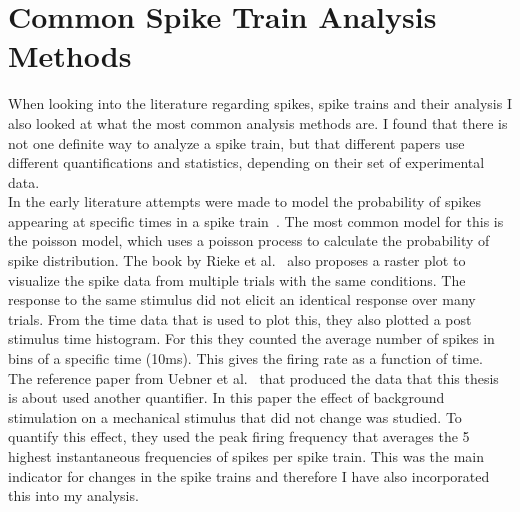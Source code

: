 \section{Common Spike Train Analysis Methods}
When looking into the literature regarding spikes, spike trains and their analysis I also looked at what the most common analysis methods are. I found that there is not one definite way to analyze a spike train, but that different papers use different quantifications and statistics, depending on their set of experimental data.\\
In the early literature attempts were made to model the probability of spikes appearing at specific times in a spike train~\cite{spikeGeneral}. The most common model for this is the poisson model, which uses a poisson process to calculate the probability of spike distribution.
The book by Rieke et al.~\cite{rieke1999spikes} also proposes a raster plot to visualize the spike data from multiple trials with the same conditions. The response to the same stimulus did not elicit an identical response over many trials. From the time data that is used to plot this, they also plotted a post stimulus time histogram. For this they counted the average number of spikes in bins of a specific time (10ms). This gives the firing rate as a function of time.\\
The reference paper from Uebner et al.~\cite{roberto} that produced the data that this thesis is about used another quantifier. In this paper the effect of background stimulation on a mechanical stimulus that did not change was studied. To quantify this effect, they used the peak firing frequency that averages the 5 highest instantaneous frequencies of spikes per spike train. This was the main indicator for changes in the spike trains and therefore I have also incorporated this into my analysis.


